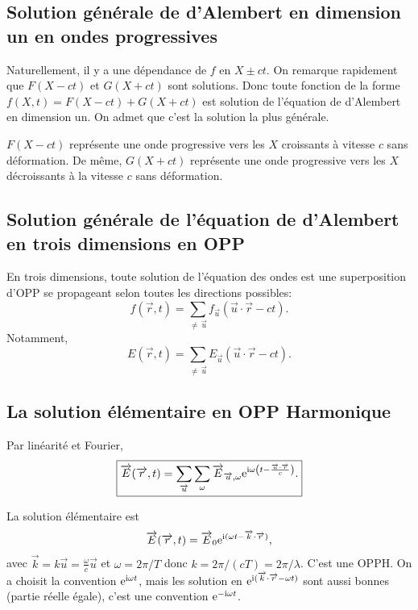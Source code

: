 \subsection{Solution générale de d'Alembert en dimension un en ondes progressives}

Naturellement, il y a une dépendance de $f$ en $X\pm ct$. On remarque rapidement que $F(X-ct)$ et $G(X+ct)$ sont solutions. Donc toute fonction de la forme $f(X,t)=F(X-ct)+G(X+ct)$ est solution de l'équation de d'Alembert en dimension un. On admet que c'est la solution la plus générale.

$F(X-ct)$ représente une onde progressive vers les $X$ croissants à vitesse $c$ sans déformation. De même, $G(X+ct)$ représente une onde progressive vers les $X$ décroissants à la vitesse $c$ sans déformation.

\subsection{Solution générale de l'équation de d'Alembert en trois dimensions en OPP}

En trois dimensions, toute solution de l'équation des ondes est une superposition d'OPP se propageant selon toutes les directions possibles:
\begin{equation*}
    \boxed{
        f(\vec{r},t)=\sum_{\neq\,\vec{u}}f_{\vec{u}}(\vec{u}\cdot\vec{r}-ct).
    }
\end{equation*}
Notamment, 
\begin{equation*}
    \boxed{
        E(\vec{r},t)=\sum_{\neq\,\vec{u}}E_{\vec{u}}(\vec{u}\cdot\vec{r}-ct).
    }
\end{equation*}

\subsection{La solution élémentaire en OPP Harmonique}

Par linéarité et Fourier, 
\begin{equation*}
    \boxed{
        \protect\overrightarrow{{E}}(\protect\overrightarrow{{r}},t)=\sum_{\protect\overrightarrow{{u}}}\sum_{\omega}\protect\overrightarrow{{E}}_{\protect\overrightarrow{{u}},\omega}\mathrm{e}^{\mathrm{i}\omega\left(t-\frac{\protect\overrightarrow{{u}}\cdot\protect\overrightarrow{{r}}}{c}\right)}.
    }
\end{equation*}

La solution élémentaire est
\begin{equation*}
    \protect\overrightarrow{{E}}(\protect\overrightarrow{{r}},t)=\protect\overrightarrow{{E}}_{0}\mathrm{e}^{\mathrm{i}(\omega t-\protect\overrightarrow{{k}}\cdot\protect\overrightarrow{{r}})},
\end{equation*}
avec $\vec{k}=k\vec{u}=\frac{\omega}{c}\vec{u}$ et $\omega=2\pi/T$ donc $k=2\pi/(cT)=2\pi / \lambda$. C'est une OPPH. On a choisit la convention $\mathrm{e}^{\mathrm{i}\omega t}$, mais les solution en $\mathrm{e}^{\mathrm{i}(\protect\overrightarrow{{k}}\cdot\protect\overrightarrow{{r}}-\omega t)}$ sont aussi bonnes (partie réelle égale), c'est une convention $\mathrm{e}^{-\mathrm{i}\omega t}$.

